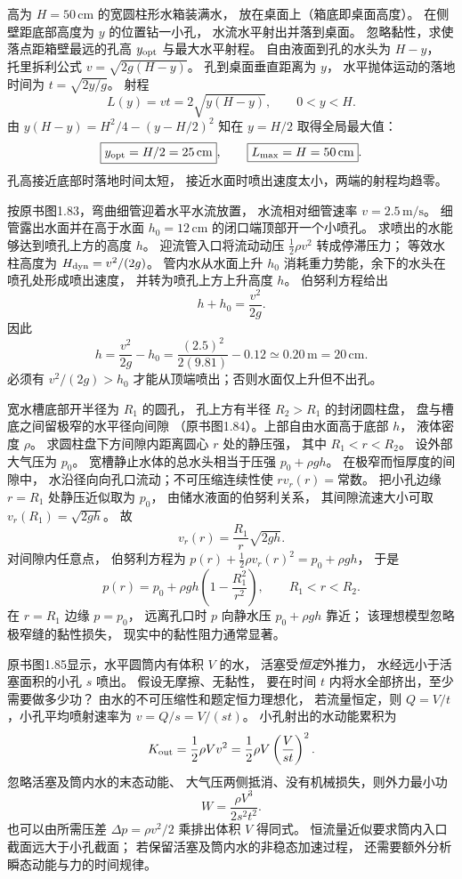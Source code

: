 高为 $H=50\,\mathrm{cm}$ 的宽圆柱形水箱装满水，
放在桌面上（箱底即桌面高度）。
在侧壁距底部高度为 $y$ 的位置钻一小孔，
水流水平射出并落到桌面。
忽略黏性，求使落点距箱壁最远的孔高
$y_{\rm opt}$ 与最大水平射程。
\exsolution
自由液面到孔的水头为 $H-y$，
托里拆利公式
$v=\sqrt{2g(H-y)}$。
孔到桌面垂直距离为 $y$，
水平抛体运动的落地时间为
$t=\sqrt{2y/g}$。
射程
\[
L(y)=vt=2\sqrt{y(H-y)},\qquad 0<y<H.
\]
由
$y(H-y)=H^2/4-(y-H/2)^2$
知在 $y=H/2$ 取得全局最大值：
\[
\boxed{y_{\rm opt}=H/2=25\,\mathrm{cm}},\qquad
\boxed{L_{\max}=H=50\,\mathrm{cm}}.
\]
\excheck 孔高接近底部时落地时间太短，
接近水面时喷出速度太小，两端的射程均趋零。

按原书图1.83，弯曲细管迎着水平水流放置，
水流相对细管速率 $v=2.5\,\mathrm{m/s}$。
细管露出水面并在高于水面
$h_0=12\,\mathrm{cm}$ 的闭口端顶部开一个小喷孔。
求喷出的水能够达到喷孔上方的高度 $h$。
\exsolution
迎流管入口将流动动压
$\tfrac12\rho v^2$ 转成停滞压力；
等效水柱高度为
$H_{\rm dyn}=v^2/(2g)$。
管内水从水面上升 $h_0$
消耗重力势能，余下的水头在喷孔处形成喷出速度，
并转为喷孔上方上升高度 $h$。
伯努利方程给出
\[
h+h_0=\frac{v^2}{2g}.
\]
因此
\[
\boxed{h=\frac{v^2}{2g}-h_0
=\frac{(2.5)^2}{2(9.81)}-0.12
\simeq0.20\,\mathrm m=20\,\mathrm{cm}}.
\]
\excheck 必须有 $v^2/(2g)>h_0$
才能从顶端喷出；否则水面仅上升但不出孔。

宽水槽底部开半径为 $R_1$ 的圆孔，
孔上方有半径 $R_2>R_1$ 的封闭圆柱盘，
盘与槽底之间留极窄的水平径向间隙
（原书图1.84）。上部自由水面高于底部 $h$，
液体密度 $\rho$。
求圆柱盘下方间隙内距离圆心 $r$ 处的静压强，
其中 $R_1<r<R_2$。
\exsolution
设外部大气压为 $p_0$。
宽槽静止水体的总水头相当于压强
$p_0+\rho gh$。
在极窄而恒厚度的间隙中，
水沿径向向孔口流动；不可压缩连续性使
$r v_r(r)=$常数。
把小孔边缘 $r=R_1$ 处静压近似取为 $p_0$，
由储水液面的伯努利关系，
其间隙流速大小可取
$v_r(R_1)=\sqrt{2gh}$。
故
\[
v_r(r)=\frac{R_1}{r}\sqrt{2gh}.
\]
对间隙内任意点，
伯努利方程为
$p(r)+\tfrac12\rho v_r(r)^2=p_0+\rho gh$，
于是
\[
\boxed{p(r)=p_0+\rho gh
\left(1-\frac{R_1^2}{r^2}\right)},
\qquad R_1<r<R_2.
\]
\excheck 在 $r=R_1$ 边缘 $p=p_0$，
远离孔口时 $p$ 向静水压 $p_0+\rho gh$ 靠近；
该理想模型忽略极窄缝的黏性损失，
现实中的黏性阻力通常显著。

原书图1.85显示，水平圆筒内有体积 $V$ 的水，
活塞受\emph{恒定}外推力，
水经远小于活塞面积的小孔 $s$ 喷出。
假设无摩擦、无黏性，
要在时间 $t$ 内将水全部挤出，至少需要做多少功？
\exsolution
由水的不可压缩性和题定恒力理想化，
若流量恒定，则
$Q=V/t$，小孔平均喷射速率为
$v=Q/s=V/(st)$。
小孔射出的水动能累积为
\[
K_{\rm out}=
\frac12\rho V v^2
=\frac12\rho V\left(\frac{V}{st}\right)^2.
\]
忽略活塞及筒内水的末态动能、
大气压两侧抵消、没有机械损失，则外力最小功
\[
\boxed{W=\frac{\rho V^3}{2s^2t^2}}.
\]
也可以由所需压差
$\Delta p=\rho v^2/2$ 乘排出体积 $V$ 得同式。
\excheck 恒流量近似要求筒内入口截面远大于小孔截面；
若保留活塞及筒内水的非稳态加速过程，
还需要额外分析瞬态动能与力的时间规律。

